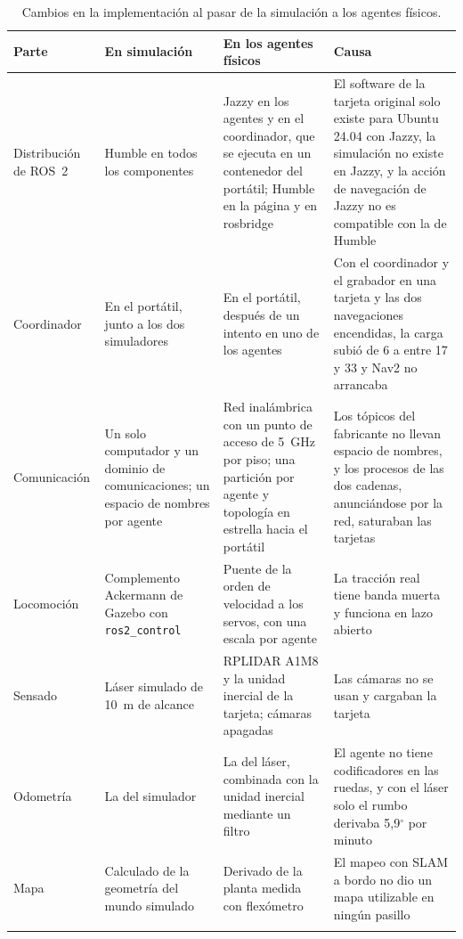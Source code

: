 \begin{table}[H]
  \centering\footnotesize
  \caption{Cambios en la implementación al pasar de la simulación a los agentes físicos.}
  \label{tab:sim-vehiculos}
  \begin{tabular}{@{}p{}p{}p{}p{}@{}}
    \toprule
    \textbf{Parte} & \textbf{En simulación} & \textbf{En los agentes físicos} & \textbf{Causa} \\ \midrule
    Distribución de ROS~2 & Humble en todos los componentes & Jazzy en los agentes y en el coordinador, que se ejecuta en un contenedor del portátil; Humble en la página y en rosbridge & El software de la tarjeta original solo existe para Ubuntu 24.04 con Jazzy, la simulación no existe en Jazzy, y la acción de navegación de Jazzy no es compatible con la de Humble \\ \addlinespace
    Coordinador & En el portátil, junto a los dos simuladores & En el portátil, después de un intento en uno de los agentes & Con el coordinador y el grabador en una tarjeta y las dos navegaciones encendidas, la carga subió de 6 a entre 17 y 33 y Nav2 no arrancaba \\ \addlinespace
    Comunicación & Un solo computador y un dominio de comunicaciones; un espacio de nombres por agente & Red inalámbrica con un punto de acceso de 5~GHz por piso; una partición por agente y topología en estrella hacia el portátil & Los tópicos del fabricante no llevan espacio de nombres, y los procesos de las dos cadenas, anunciándose por la red, saturaban las tarjetas \\ \addlinespace
    Locomoción & Complemento Ackermann de Gazebo con \texttt{ros2\_control} & Puente de la orden de velocidad a los servos, con una escala por agente & La tracción real tiene banda muerta y funciona en lazo abierto \\ \addlinespace
    Sensado & Láser simulado de 10~m de alcance & RPLIDAR A1M8 y la unidad inercial de la tarjeta; cámaras apagadas & Las cámaras no se usan y cargaban la tarjeta \\ \addlinespace
    Odometría & La del simulador & La del láser, combinada con la unidad inercial mediante un filtro & El agente no tiene codificadores en las ruedas, y con el láser solo el rumbo derivaba 5,9$^\circ$ por minuto \\ \addlinespace
    Mapa & Calculado de la geometría del mundo simulado & Derivado de la planta medida con flexómetro & El mapeo con SLAM a bordo no dio un mapa utilizable en ningún pasillo \\ \addlinespace

\end{tabular}
\end{table}
